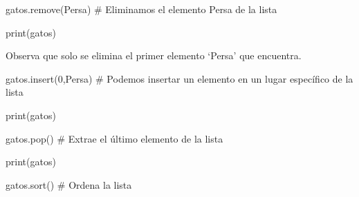 \documentclass[
  letterpaper,
  DIV=11,
  numbers=noendperiod]{scrreprt}
\newenvironment{Shaded}{\begin{snugshade}}{\end{snugshade}}
\newcommand{\BuiltInTok}[1]{\textcolor[rgb]{0.00,0.23,0.31}{#1}}
\newcommand{\CommentTok}[1]{\textcolor[rgb]{0.37,0.37,0.37}{#1}}
\newcommand{\DecValTok}[1]{\textcolor[rgb]{0.68,0.00,0.00}{#1}}
\newcommand{\NormalTok}[1]{\textcolor[rgb]{0.00,0.23,0.31}{#1}}
\newcommand{\StringTok}[1]{\textcolor[rgb]{0.13,0.47,0.30}{#1}}
\begin{document}
\begin{Shaded}
\begin{Highlighting}[]
\NormalTok{gatos.remove(}\StringTok{\textquotesingle{}Persa\textquotesingle{}}\NormalTok{) }\CommentTok{\# Eliminamos el elemento \textquotesingle{}Persa\textquotesingle{} de la lista}
\end{Highlighting}
\end{Shaded}

\begin{Shaded}
\begin{Highlighting}[]
\BuiltInTok{print}\NormalTok{(gatos) }
\end{Highlighting}
\end{Shaded}

Observa que solo se elimina el primer elemento `Persa' que encuentra.

\begin{Shaded}
\begin{Highlighting}[]
\NormalTok{gatos.insert(}\DecValTok{0}\NormalTok{,}\StringTok{\textquotesingle{}Persa\textquotesingle{}}\NormalTok{) }\CommentTok{\# Podemos insertar un elemento en un lugar específico de la lista}
\end{Highlighting}
\end{Shaded}

\begin{Shaded}
\begin{Highlighting}[]
\BuiltInTok{print}\NormalTok{(gatos)}
\end{Highlighting}
\end{Shaded}

\begin{Shaded}
\begin{Highlighting}[]
\NormalTok{gatos.pop() }\CommentTok{\# Extrae el último elemento de la lista}
\end{Highlighting}
\end{Shaded}

\begin{Shaded}
\begin{Highlighting}[]
\BuiltInTok{print}\NormalTok{(gatos)}
\end{Highlighting}
\end{Shaded}

\begin{Shaded}
\begin{Highlighting}[]
\NormalTok{gatos.sort() }\CommentTok{\# Ordena la lista}
\end{Highlighting}
\end{Shaded}
\end{document}
